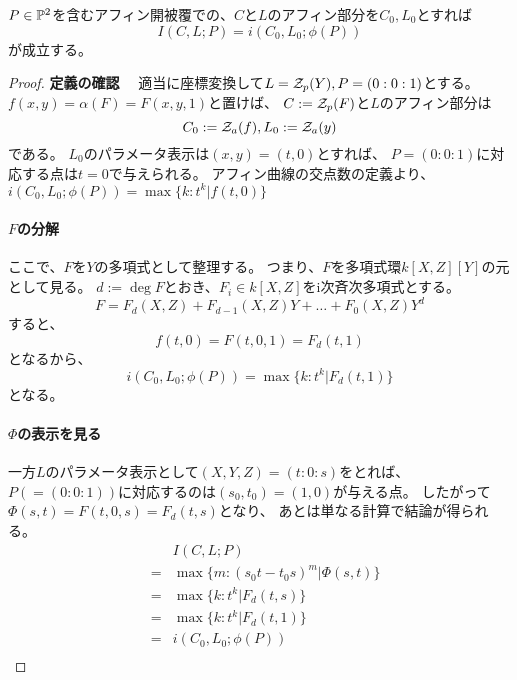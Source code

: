 \documentclass[a4paper]{jsarticle}
\begin{document}
    \begin{Prop}
        $P \in \mathbb{P}^2$を含むアフィン開被覆での、$C$と$L$のアフィン部分を$C_0, L_0$とすれば
        \[ I(C, L; P)=i(C_0, L_0; \phi(P)) \]
        が成立する。
    \end{Prop}
    \begin{proof}
        \textbf{定義の確認}~~
        適当に座標変換して$L=\mathcal{Z}_p(Y), P=(0:0:1)$とする。
        $f(x, y)=\alpha(F)=F(x, y, 1)$と置けば、
        $C:=\mathcal{Z}_p(F)$と$L$のアフィン部分は
        \[ C_0:=\mathcal{Z}_a(f), L_0:=\mathcal{Z}_a(y) \]
        である。
        $L_0$のパラメータ表示は$(x, y)=(t, 0)$とすれば、
        $P=(0:0:1)$に対応する点は$t=0$で与えられる。
        アフィン曲線の交点数の定義より、
        $i(C_0, L_0; \phi(P))=\max \{ k : t^k|f(t,0) \}$
        
        \paragraph{$F$の分解}
        ここで、$F$を$Y$の多項式として整理する。
        つまり、$F$を多項式環$k[X, Z][Y]$の元として見る。
        $d:=\deg F$とおき、$F_i \in k[X, Z]$をi次斉次多項式とする。
        \[ F=F_d(X, Z)+F_{d-1}(X, Z)Y + \dots + F_0(X, Z) Y^d \]
        すると、
        \[ f(t, 0)=F(t, 0, 1)=F_d(t, 1) \]
        となるから、
        \[ i(C_0, L_0; \phi(P))=\max \{ k : t^k|F_d(t,1) \} \]
        となる。

        \paragraph{$\Phi$の表示を見る}
        一方$L$のパラメータ表示として$(X, Y, Z)=(t:0:s)$をとれば、
        $P(=(0:0:1))$に対応するのは$(s_0,t_0)=(1,0)$が与える点。
        したがって$\Phi(s, t)=F(t, 0, s)=F_d(t, s)$となり、
        あとは単なる計算で結論が得られる。
        \begin{eqnarray*}
            &{}&    I(C, L; P) \\
            &=&     \max \{ m : (s_0 t-t_0 s)^m | \Phi(s,t) \} \\
            &=&     \max \{ k : t^k|F_d(t,s) \} \\
            &=&     \max \{ k : t^k|F_d(t,1) \} \\
            &=&     i(C_0, L_0; \phi(P)) \\
        \end{eqnarray*}
        
    \end{proof}
\end{document}
